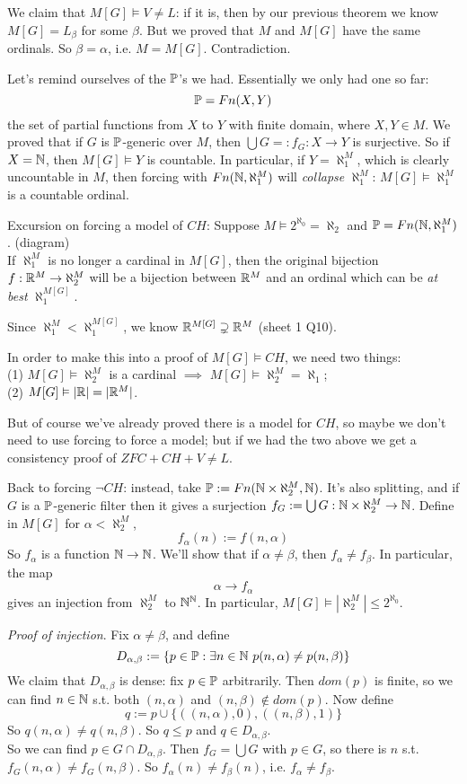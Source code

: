 \documentclass[a4paper]{article}
\begin{document}
We claim that $M[G] \vDash V \neq L$: if it is, then by our previous theorem we know $M[G] = L_\beta$ for some $\beta$. But we proved that $M$ and $M[G]$ have the same ordinals. So $\beta = \alpha$, i.e. $M=M[G]$. Contradiction.

Let's remind ourselves of the $\P$'s we had. Essentially we only had one so far: 
\[
\P = Fn(X,Y)
\]
the set of partial functions from $X$ to $Y$ with finite domain, where $X,Y \in M$. We proved that if $G$ is $\P$-generic over $M$, then $\bigcup G =: f_G : X \to Y$ is surjective. So if $X = \N$, then $M[G] \vDash Y$ is countable. In particular, if $Y = \aleph_1^M$, which is clearly uncountable in $M$, then forcing with $Fn(\N,\aleph_1^M)$ will \emph{collapse} $\aleph_1^M$: $M[G] \vDash \aleph_1^M$ is a countable ordinal.

Excursion on forcing a model of $CH$: Suppose $M \vDash 2^{\aleph_0} = \aleph_2$ and $\P = Fn(\N,\aleph_1^M)$. (diagram)\\
If $\aleph_1^M$ is no longer a cardinal in $M[G]$, then the original bijection $f:\R^M \to \aleph_2^M$ will be a bijection between $\R^M$ and an ordinal which can be \emph{at best} $\aleph_1^{M[G]}$.

Since $\aleph_1^M < \aleph_1^{M[G]}$, we know $\R^{M[G]} \supsetneq \R^M$ (sheet 1 Q10).

In order to make this into a proof of $M[G] \vDash CH$, we need two things:\\
(1) $M[G] \vDash \aleph_2^M$ is a cardinal $\implies$ $M[G] \vDash \aleph_2^M = \aleph_1$;\\
(2) $M[G] \vDash |\R| = |\R^M|$.

But of course we've already proved there is a model for $CH$, so maybe we don't need to use forcing to force a model; but if we had the two above we get a consistency proof of $ZFC+CH+V \neq L$.

Back to forcing $\neg CH$: instead, take $\P := Fn(\N\times\aleph_2^M, \N)$. It's also splitting, and if $G$ is a $\P$-generic filter then it gives a surjection $f_G:=\bigcup G: \N \times \aleph_2^M \to \N$. Define in $M[G]$ for $\alpha < \aleph_2^M$,
\[
f_\alpha(n) := f(n,\alpha)
\]
So $f_\alpha$ is a function $\N \to \N$. We'll show that if $\alpha \neq \beta$, then $f_\alpha \neq f_\beta$. In particular, the map
\[
\alpha \to f_\alpha
\]
gives an injection from $\aleph_2^M$ to $\N^\N$. In particular, $M[G] \vDash |\aleph_2^M| \leq 2^{\aleph_0}$.

\emph{Proof of injection}. Fix $\alpha \neq \beta$, and define
\[
D_{\alpha,\beta}:=\{p\in \P:\exists n\in \N \ p(n,\alpha) \neq p(n,\beta)\}
\]
We claim that $D_{\alpha,\beta}$ is dense: fix $p \in \P$ arbitrarily. Then $dom(p)$ is finite, so we can find $n \in \N$ s.t. both $(n,\alpha)$ and $(n,\beta) \not\in dom(p)$. Now define
\[
q:=p \cup \{((n,\alpha),0),((n,\beta),1)\}
\]
So $q(n,\alpha) \neq q(n,\beta)$. So $q \leq p$ and $q \in D_{\alpha,\beta}$.\\
So we can find $p \in G \cap D_{\alpha,\beta}$. Then $f_G = \bigcup G$ with $p \in G$, so there is $n$ s.t. $f_G(n,\alpha) \neq f_G(n,\beta)$. So $f_\alpha(n) \neq f_\beta(n)$, i.e. $f_\alpha \neq f_\beta$.
\end{document}

